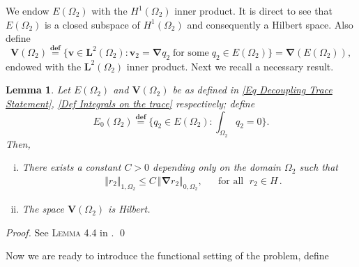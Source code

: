 \documentclass[3p]{elsarticle}
\newtheorem{lemma}[theorem]{Lemma}
\def\V{\mathbf V}
\def\L{\mathbf L}
\def\v{\mathbf v}
\def\grad{\bm{\nabla}}
\def\vtwo{\mathbf{v}_{2}}
\def\qtwo{q_{2}}
\def\rtwo{r_{2}}
\def\defining{\overset{\mathbf{def}} =}
\begin{document}
We endow $E(\Omega_{2})$ with the $H^{1}(\Omega_{2})$ inner product. It is direct to see that $E(\Omega_{2})$ is a closed subspace of $H^{1}(\Omega_{2})$ and consequently a Hilbert space. Also define
%
% 
\begin{equation}\label{Def Integrals on the trace}
%
\V(\Omega_{2}) \defining  \big\{ \v\in \L^{\! 2}(\Omega_{2}): \vtwo = \grad \qtwo\;
\text{for some}\; \qtwo\in E(\Omega_{2}) \big\} 
= \grad (E(\Omega_{2}) ) ,
%
\end{equation}
%
% 
endowed with the $\L^{2}(\Omega_{2})$ inner product. Next we recall a necessary result.
%
%
\begin{lemma}\label{Th Completeness of V(Omega_2)}
Let $E(\Omega_{2})$ and $\V(\Omega_{2})$ be as defined in \eqref{Eq Decoupling Trace Statement},  \eqref{Def Integrals on the trace} respectively; define 
%
\begin{equation}\label{Def Space Generating with Isomorphism}
E_{0} (\Omega_{2})\defining \Big\{ \qtwo \in E(\Omega_{2}): \int_{\Omega_{2}}\qtwo = 0 \Big\} .
\end{equation}
%
Then,
%
\begin{enumerate}[(i)]
\item There exists a constant $C>0$ depending only on the domain $\Omega_{2}$ such that
%
\begin{align}\label{Ineq Control on Space Generating with Isomorphism}
& \Vert \rtwo \Vert_{1, \Omega_{2}} \leq C \, \Vert \grad \rtwo \Vert_{0, \Omega_{2}} , &
& \text{for all }\; \rtwo\in H\, .
\end{align}
%

\item The space $\V(\Omega_{2})$ is Hilbert.
%
\end{enumerate}

\end{lemma}
%
\begin{proof} 
See  \textsc{Lemma} 4.4 in \cite{MoralesNaranjo}.
\qed
%  
\end{proof}
%
%
Now we are ready to introduce the functional setting of the problem, define
%
%
\end{document}
